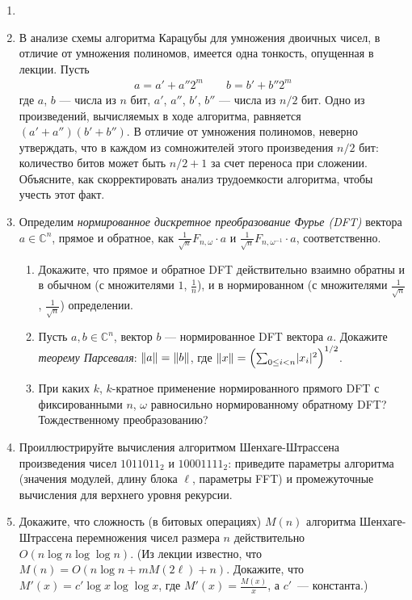 \documentclass[11pt]{article}
\newenvironment{exercise}{\item}{}
\newcommand{\w}{\omega}
\newcommand{\Compl}{\mathbb{C}}
\begin{document}
\begin{enumerate}
\begin{exercise}
\end{exercise}

\begin{exercise}
В анализе схемы алгоритма Карацубы для умножения двоичных чисел, 
в отличие от умножения полиномов, имеется одна тонкость, опущенная в лекции.
Пусть 
{\small
\begin{gather*} 
a = a' + a'' 2^m\qquad
b = b' + b'' 2^m
\end{gather*}}%
%
где $a$, $b$ --- числа из $n$ бит, $a'$, $a''$, $b'$, $b''$ --- числа из $n/2$ бит.
Одно из произведений, вычисляемых в ходе алгоритма, равняется $(a' + a'')(b' + b'')$.
В отличие от умножения полиномов, неверно утверждать, 
что в каждом из сомножителей этого произведения $n/2$ бит:
количество битов может быть $n/2+1$ за счет переноса при сложении.
Объясните, как скорректировать анализ трудоемкости алгоритма, чтобы учесть этот факт.
\end{exercise}

\begin{exercise}
Определим {\it нормированное дискретное преобразование Фурье (DFT)} вектора $a \in\Compl^n$, прямое и обратное, как $\frac{1}{\sqrt{n}} F_{n,\w} \cdot a$ и $\frac{1}{\sqrt{n}} F_{n,\w^{-1}} \cdot a$, 
соответственно. 
%
\begin{enumerate}
%
\item Докажите, что прямое и обратное DFT действительно взаимно обратны
и в обычном (с множителями $1$, $\frac{1}{n}$), и в нормированном 
(с множителями $\frac{1}{\sqrt{n}}$, $\frac{1}{\sqrt{n}}$) определении.
%
\item Пусть $a,b \in\Compl^n$, вектор $b$ --- нормированное DFT вектора $a$.
Докажите \emph{теорему Парсеваля}: $\norm{a} = \norm{b}$, 
где $\norm{x} = \lr*{\sum_{0 \leq i < n} \abs{x_i}^2}^{1/2}$.
%
\item При каких $k$, $k$-кратное применение нормированного прямого DFT
с фиксированными $n$, $\w$ равносильно нормированному обратному DFT? 
Тождественному преобразованию?
%
\end{enumerate}
\end{exercise}


\begin{exercise}
Проиллюстрируйте вычисления алгоритмом Шенхаге-Штрассена 
произведения чисел $1011011_2$ и $10001111_2$: 
приведите параметры алгоритма (значения модулей, длину блока $\ell$, параметры FFT)
и промежуточные вычисления для верхнего уровня рекурсии. 
\end{exercise}

\begin{exercise}
Докажите, что сложность (в битовых операциях) $M(n)$ алгоритма Шенхаге-Штрассена 
перемножения чисел размера $n$ действительно $O(n\log n \log \log n)$.
(Из лекции известно, что $M(n) = O(n\log n + mM(2\ell)+n)$. 
Докажите, что 
$M'(x) = c'\log x\log\log x$, где $M'(x) = \frac{M(x)}{x}$, а $c'$~— константа.)
\end{exercise}



\end{enumerate}
\end{document}
